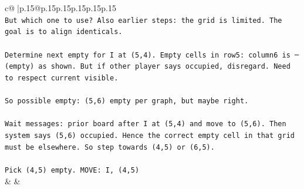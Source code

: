 \documentclass{article}
\begin{document}
{\begin{supertabular}{c@{$\;$}|p{.15\linewidth}@{}p{.15\linewidth}p{.15\linewidth}p{.15\linewidth}p{.15\linewidth}p{.15\linewidth}}
{{{\\ 
\texttt{But which one to use? Also earlier steps: the grid is limited. The goal is to align identicals.} \\
\\ 
\texttt{Determine next empty for I at (5,4). Empty cells in row5: column6 is ─ (empty) as shown. But if other player says occupied, disregard. Need to respect current visible.} \\
\\ 
\texttt{So possible empty: (5,6) empty per graph, but maybe right.} \\
\\ 
\texttt{Wait messages: prior board after I at (5,4) and move to (5,6). Then system says (5,6) occupied. Hence the correct empty cell in that grid must be elsewhere. So step towards (4,5) or (6,5).} \\
\\ 
\texttt{Pick (4,5) empty. MOVE: I, (4,5)} \\
            }
        }
    }
    & & \\ \\


\end{supertabular}}
\end{document}
